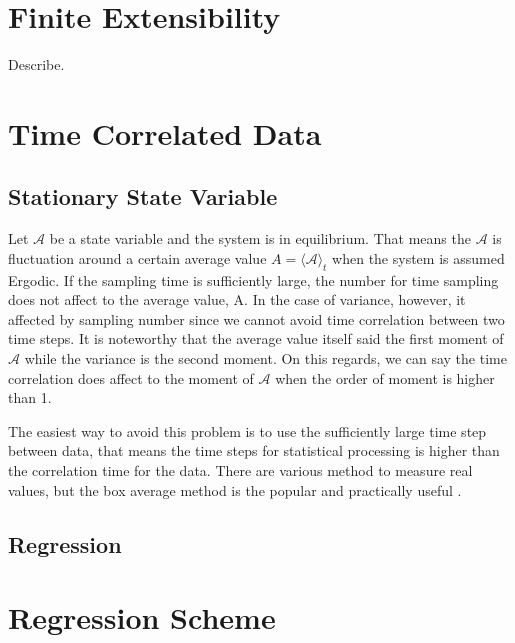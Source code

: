 \documentclass[10pt, a4paper]{report}
\begin{document}
\begin{appendices}

  \chapter{Finite Extensibility}
  Describe.

  \chapter{Time Correlated Data}
  \section{Stationary State Variable}
  Let $\mathscr{A}$ be a state variable and the system is in equilibrium. That means the $\mathscr{A}$ is fluctuation around a certain average value $A = \langle \mathscr{A}\rangle_t$ when the system is assumed Ergodic. If the sampling time is sufficiently large, the number for time sampling does not affect to the average value, A. In the case of variance, however, it affected by sampling number since we cannot avoid time correlation between two time steps. It is noteworthy that the average value itself said the first moment of $\mathscr{A}$ while the variance is the second moment. On this regards, we can say the time correlation does affect to the moment of $\mathscr{A}$ when the order of moment is higher than 1.

  The easiest way to avoid this problem is to use the sufficiently large time step between data, that means the time steps for statistical processing is higher than the correlation time for the data. There are various method to measure real values, but the box average method is the popular and practically useful \parencite{allen1989computer}.


  \section{Regression}

    
  \chapter{Regression Scheme}

\end{appendices}
\end{document}
